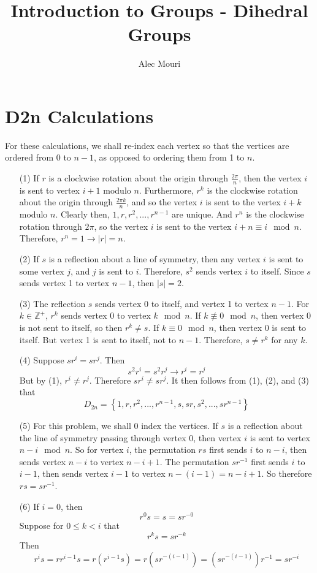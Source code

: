 \documentclass[12pt]{article}
\begin{document}
\title{Introduction to Groups - Dihedral Groups}
\author{Alec Mouri}

\maketitle
\section*{D2n Calculations}
For these calculations, we shall re-index each vertex so that the vertices are ordered from 0 to $n - 1$, as opposed to ordering them from 1 to $n$.
\begin{itemize}
\item[(1)] 
If $r$ is a clockwise rotation about the origin through $\frac{2\pi}{n}$, then the vertex $i$ is sent to vertex $i + 1$ modulo $n$. Furthermore, $r^k$ is the clockwise rotation about the origin through $\frac{2\pi k}{n}$, and so the vertex $i$ is sent to the vertex $i + k$ modulo $n$. Clearly then, $1, r, r^2, ..., r^{n - 1}$ are unique. And $r^n$ is the clockwise rotation through $2\pi$, so the vertex $i$ is sent to the vertex $i + n \equiv i \mod n$. Therefore, $r^n = 1 \rightarrow |r| = n$.
\item[(2)]
If $s$ is a reflection about a line of symmetry, then any vertex $i$ is sent to some vertex $j$, and $j$ is sent to $i$. Therefore, $s^2$ sends vertex $i$ to itself. Since $s$ sends vertex 1 to vertex $n - 1$, then $|s| = 2$.
\item[(3)]
The reflection $s$ sends vertex 0 to itself, and vertex 1 to vertex $n - 1$. For $k \in \mathbb{Z}^+$, $r^k$ sends vertex 0 to vertex $k \mod n$. If $k \not \equiv 0 \mod n$, then vertex 0 is not sent to itself, so then $r^k \neq s$. If $k \equiv 0 \mod n$, then vertex 0 is sent to itself. But vertex 1 is sent to itself, not to $n - 1$. Therefore, $s \neq r^k$ for any $k$.
\item[(4)]
Suppose $sr^i = sr^j$. Then
$$s^2r^i = s^2r^j \rightarrow r^i = r^j$$
But by (1), $r^i \neq r^j$. Therefore $sr^i \neq
sr^j$. It then follows from (1), (2), and (3) that
$$D_{2n} = \left\lbrace 1, r, r^2, ..., r^{n - 1}, s, sr, s^2, ..., sr^{n - 1}\right\rbrace$$
\item[(5)]
For this problem, we shall 0 index the vertices. If $s$ is a reflection about the line of symmetry passing through vertex 0, then vertex $i$ is sent to vertex $n - i \mod n$. So for vertex $i$, the permutation $rs$ first sends $i$ to $n - i$, then sends vertex $n - i$ to vertex $n - i + 1$. The permutation $sr^{-1}$ first sends $i$ to $i - 1$, then sends vertex $i - 1$ to vertex $n - (i - 1) = n - i + 1$. So therefore $rs = sr^{-1}$.
\item[(6)]
If $i = 0$, then
$$r^0s = s = sr^{-0}$$
Suppose for $0 \leq k < i$ that
$$r^ks = sr^{-k}$$
Then 
$$r^is = rr^{i - 1}s = r(r^{i - 1}s) = r(sr^{-(i - 1)}) = (sr^{-(i - 1)})r^{-1} = sr^{-i}$$
\end{itemize}
\end{document}
